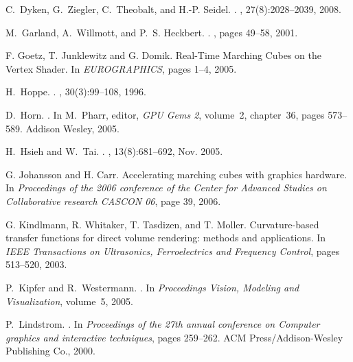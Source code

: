 \documentclass[10pt,journal,cspaper,compsoc]{IEEEtran}
\begin{document}
\begin{thebibliography}{10}
C.~Dyken, G.~Ziegler, C.~Theobalt, and H.-P. Seidel.
.
, 27(8):2028--2039, 2008.

M.~Garland, A.~Willmott, and P.~S. Heckbert.
.
, pages 49--58, 2001.

F. Goetz, T. Junklewitz and G. Domik.
\newblock Real-Time Marching Cubes on the Vertex Shader.
\newblock In {\em EUROGRAPHICS}, pages 1--4, 2005.

H.~Hoppe.
.
, 30(3):99--108, 1996.

D.~Horn.
.
\newblock In M.~Pharr, editor, {\em GPU Gems 2}, volume~2, chapter~36, pages
  573--589. Addison Wesley, 2005.

H.~Hsieh and W.~Tai.
.
, 13(8):681--692, Nov.
  2005.
  
G. Johansson and H. Carr.
\newblock Accelerating marching cubes with graphics hardware.
\newblock In {\em Proceedings of the 2006 conference of the Center for Advanced Studies on Collaborative research CASCON 06}, page 39, 2006.

G. Kindlmann, R. Whitaker, T. Tasdizen, and T. Moller.
\newblock Curvature-based transfer functions for direct volume rendering: methods and applications.
\newblock In {\em IEEE Transactions on Ultrasonics, Ferroelectrics and Frequency Control}, pages 513--520, 2003.

P.~Kipfer and R.~Westermann.
.
\newblock In {\em Proceedings Vision, Modeling and Visualization}, volume~5,
  2005.

P.~Lindstrom.
.
\newblock In {\em Proceedings of the 27th annual conference on Computer
  graphics and interactive techniques}, pages 259--262. ACM
  Press/Addison-Wesley Publishing Co., 2000.


\end{thebibliography}
\end{document}
